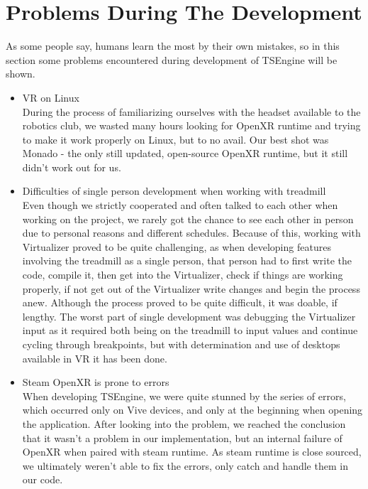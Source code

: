 \newpage
\section{Problems During The Development}
\label{sec:problems}
\hspace{\parindent}
As some people say, humans learn the most by their own mistakes, so in this section some problems encountered during development of TSEngine will be shown.
\begin{itemize}
    \item {VR on Linux}\\
    During the process of familiarizing ourselves with the headset available to the robotics club, we wasted many hours looking for OpenXR runtime and trying to make it work properly on Linux, but to no avail. Our best shot was Monado - the only still updated, open-source OpenXR runtime, but it still didn't work out for us. 
    
    \item {Difficulties of single person development when working with treadmill}\\
    Even though we strictly cooperated and often talked to each other when working on the project, we rarely got the chance to see each other in person due to personal reasons and different schedules. Because of this, working with Virtualizer proved to be quite challenging, as when developing features involving the treadmill as a single person, that person had to first write the code, compile it, then get into the Virtualizer, check if things are working properly, if not get out of the Virtualizer write changes and begin the process anew. Although the process proved to be quite difficult, it was doable, if lengthy. The worst part of single development was debugging the Virtualizer input as it required both being on the treadmill to input values and continue cycling through breakpoints, but with determination and use of desktops available in VR it has been done.
    
    \item {Steam OpenXR is prone to errors}\\
    When developing TSEngine, we were quite stunned by the series of errors, which occurred only on Vive devices, and only at the beginning when opening the application. After looking into the problem, we reached the conclusion that it wasn't a problem in our implementation, but an internal failure of OpenXR when paired with steam runtime. As steam runtime is close sourced, we ultimately weren't able to fix the errors, only catch and handle them in our code. 
    

\end{itemize}
